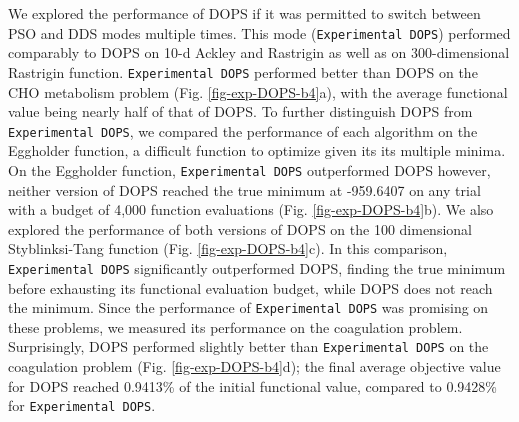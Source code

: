 \documentclass{bmcart}
\begin{document}
We explored the performance of DOPS if it was permitted to switch between PSO and DDS modes multiple times.
This mode (\texttt{Experimental~DOPS}) performed comparably to DOPS on 10-d Ackley and Rastrigin as well as on 300-dimensional Rastrigin function.
\texttt{Experimental~DOPS} performed better than DOPS on the CHO metabolism problem (Fig. \ref{fig-exp-DOPS-b4}a),
with the average functional value being nearly half of that of DOPS.
To further distinguish DOPS from \texttt{Experimental~DOPS}, we compared the performance of each algorithm on the Eggholder function,
a difficult function to optimize given its its multiple minima.
On the Eggholder function, \texttt{Experimental~DOPS} outperformed DOPS however, neither version of DOPS reached the true minimum at -959.6407 on any trial with a budget of 4,000 function evaluations (Fig. \ref{fig-exp-DOPS-b4}b).
We also explored the performance of both versions of DOPS on the 100 dimensional Styblinksi-Tang function \cite{styblinski1990experiments} (Fig. \ref{fig-exp-DOPS-b4}c).
In this comparison, \texttt{Experimental~DOPS} significantly outperformed DOPS, finding the true minimum before exhausting its functional evaluation budget, while DOPS does not reach the minimum.
Since the performance of \texttt{Experimental~DOPS} was promising on these problems, we measured its performance on the coagulation problem.
Surprisingly, DOPS performed slightly better than \texttt{Experimental~DOPS} on the coagulation problem (Fig. \ref{fig-exp-DOPS-b4}d);
the final average objective value for DOPS reached 0.9413\% of the initial functional value, compared to 0.9428\% for \texttt{Experimental~DOPS}.
\end{document}
